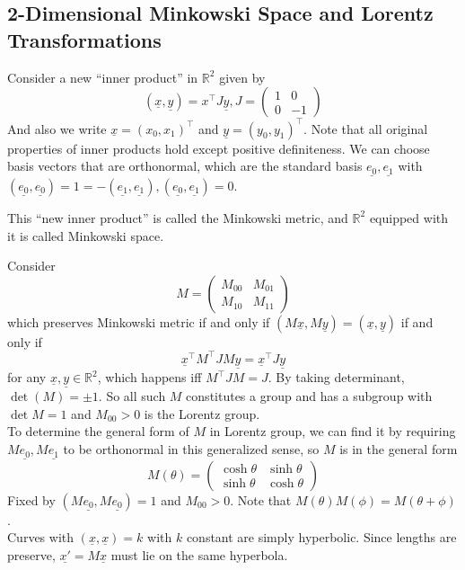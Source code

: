 \subsection{2-Dimensional Minkowski Space and Lorentz Transformations}
Consider a new ``inner product'' in $\mathbb R^2$ given by
$$(\underline{x},\underline{y})=x^\top J\underline{y},J=\begin{pmatrix}
    1&0\\
    0&-1
\end{pmatrix}$$
And also we write $\underline{x}=(x_0,x_1)^\top$ and $\underline{y}=(y_0,y_1)^\top$.
Note that all original properties of inner products hold except positive definiteness.
We can choose basis vectors that are orthonormal, which are the standard basis $\underline{e_0},\underline{e_1}$ with $(\underline{e_0},\underline{e_0})=1=-(\underline{e_1},\underline{e_1}), (\underline{e_0},\underline{e_1})=0$.
\begin{definition}
    This ``new inner product'' is called the Minkowski metric, and $\mathbb R^2$ equipped with it is called Minkowski space.
\end{definition}
Consider
$$M=\begin{pmatrix}
    M_{00}&M_{01}\\
    M_{10}&M_{11}
\end{pmatrix}$$
which preserves Minkowski metric if and only if $(M\underline{x},M\underline{y})=(\underline{x},\underline{y})$ if and only if
$$\underline{x}^\top M^\top JM\underline{y}=\underline{x}^\top J\underline{y}$$
for any $\underline{x},\underline{y}\in\mathbb R^2$, which happens iff $M^\top JM=J$.
By taking determinant, $\det(M)=\pm 1$.
So all such $M$ constitutes a group and has a subgroup with $\det M=1$ and $M_00>0$ is the Lorentz group.\\
To determine the general form of $M$ in Lorentz group, we can find it by requiring $M\underline{e_0},M\underline{e_1}$ to be orthonormal in this generalized sense, so $M$ is in the general form
$$M(\theta)=\begin{pmatrix}
    \cosh\theta&\sinh\theta\\
    \sinh\theta&\cosh\theta
\end{pmatrix}$$
Fixed by $(M\underline{e_0},M\underline{e_0})=1$ and $M_{00}>0$.
Note that $M(\theta)M(\phi)=M(\theta+\phi)$.\\
Curves with $(\underline{x},\underline{x})=k$ with $k$ constant are simply hyperbolic.
Since lengths are preserve, $\underline{x'}=M\underline{x}$ must lie on the same hyperbola.\\

